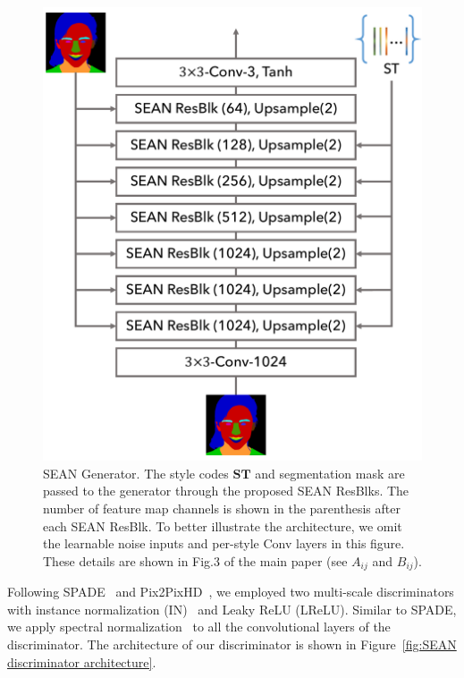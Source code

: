 \documentclass[10pt,twocolumn,letterpaper]{article}
\begin{document}
\begin{figure}[ht]
\centering
\includegraphics[width=0.9\linewidth]{Supp/architecture/supp_generator.pdf}
\caption{SEAN Generator. The style codes $\mathbf{ST}$ and segmentation mask are passed to the generator through the proposed SEAN ResBlks. The number of feature map channels is shown in the parenthesis after each SEAN ResBlk. To better illustrate the architecture, we omit the learnable noise inputs and per-style Conv layers in this figure. These details are shown in Fig.3 of the main paper (see $A_{ij}$ and $B_{ij}$).}
\label{fig:SEAN generator architecture}
\end{figure}


 Following SPADE~\cite{park2019SPADE} and Pix2PixHD~\cite{wang2018pix2pixHD}, we employed two multi-scale discriminators with instance normalization (IN)~\cite{ulyanov2016instance} and Leaky ReLU (LReLU). Similar to SPADE, we apply spectral normalization~\cite{miyato2018spectral} to all the convolutional layers of the discriminator. The architecture of our discriminator is shown in Figure~\ref{fig:SEAN discriminator architecture}.
 
\end{document}

